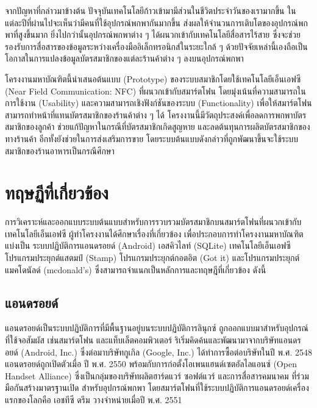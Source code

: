 \documentclass[12pt,a4paper]{article}
\begin{document}
จากปัญหาที่กล่าวมาข้างต้น ปัจจุบันเทคโนโลยีก้าวเข้ามามีส่วนในชีวิตประจำวันของเรามากขึ้น ในแต่ละปีที่ผ่านไปจะเห็นว่ามีคนที่ใช้อุปกรณ์พกพากันมากขึ้น ส่งผลให้จำนวนการเติบโตของอุปกรณ์พกพาที่สูงขึ้นมาก \cite{itm:shopping} ยิ่งไปกว่านั้นอุปกรณ์พกพาต่าง ๆ ได้ผนวกเข้ากับเทคโนโลยีสื่อสารไร้สาย ซึ่งจะช่วยรองรับการสื่อสารของข้อมูลระหว่างเครื่องมืออิเล็กทรอนิกส์ในระยะใกล้ ๆ \cite{itm:rpp-mobile} ด้วยปัจจัยเหล่านี้เองถือเป็นโอกาสในการแปลงข้อมูลบัตรสมาชิกของแต่ละร้านค้าต่าง ๆ ลงบนอุปกรณ์พกพา 

โครงงานมหาบัณฑิตนี้นำเสนอต้นแบบ (Prototype) ของระบบสมาชิกโดยใช้เทคโนโลยีเอ็นเอฟซี (Near Field Communication: NFC) ที่ผนวกเข้ากับสมาร์ตโฟน โดยมุ่งเน้นที่ความสามารถในการใช้งาน (Usability) และความสามารถเชิงฟังก์ชันของระบบ (Functionality) เพื่อให้สมาร์ตโฟนสามารถทำหน้าที่แทนบัตรสมาชิกของร้านค้าต่าง ๆ ได้ โครงงานนี้มีวัตถุประสงค์เพื่อลดการพกพาบัตรสมาชิกของลูกค้า ช่วยแก้ปัญหาในกรณีที่บัตรสมาชิกเกิดสูญหาย และลดต้นทุนการผลิตบัตรสมาชิกของทางร้านค้า อีกทั้งยังช่วยในการส่งเสริมการขาย โดยระบบต้นแบบดังกล่าวที่ถูกพัฒนาขึ้นจะใช้ระบบสมาชิกของร้านอาหารเป็นกรณีศึกษา

\section{ทฤษฏีที่เกี่ยวข้อง}
การวิเคราะห์และออกแบบระบบต้นแบบสำหรับการรวบรวมบัตรสมาชิกบนสมาร์ตโฟนที่ผนวกเข้ากับเทคโนโลยีเอ็นเอฟซี ผู้ทำโครงงานได้ศึกษาเรื่องที่เกี่ยวข้อง เพื่อประ\mbox{กอบ}การทําโครงงานมหาบัณฑิต แบ่งเป็น ระบบปฏิบัติการแอนดรอยด์ (Android) เอสคิวไลท์ (SQLite) เทคโนโลยีเอ็นเอฟซี โปรแกรมประยุกต์แสตมป์ (Stamp) โปรแกรมประยุกต์\mbox{กอต}อิต (Got it) และโปรแกรมประยุกต์แมคโดนัลด์ (mcdonald's) ซึ่ง\mbox{สามารถ}จําแนกเป็นหลักการและทฤษฎีที่เกี่ยวข้อง ดังนี้

\subsection{แอนดรอยด์}
แอนดรอยด์เป็นระบบปฏิบัติการที่มีพื้นฐานอยู่บนระบบปฏิบัติการลินุกซ์ ถูกออกแบบมาสำหรับอุปกรณ์ที่ใช้จอสัมผัส เช่นสมาร์ตโฟน และแท็บเล็ตคอมพิวเตอร์ ริเริ่มคิดค้นและพัฒนามาจากบริษัทแอนดรอยด์ (Android, Inc.) ซึ่งต่อมาบริษัทกูเกิล (Google, Inc.) ได้ทำการซื้อต่อบริษัทในปี พ.ศ. 2548 แอนดรอยด์ถูกเปิดตัวเมื่อ ปี พ.ศ. 2550 พร้อมกับการก่อตั้งโอเพนแฮนด์เซตอัลไลแอนซ์ (Open Handset Alliance) ซึ่งเป็นกลุ่มของบริษัทผลิตฮาร์ดแวร์ ซอฟต์แวร์ และการสื่อสารคมนาคม ที่ร่วมมือกันสร้างมาตรฐานเปิด สำหรับอุปกรณ์พกพา โดยสมาร์ตโฟนที่ใช้ระบบปฏิบัติการแอนดรอยด์เครื่องแรกของโลกคือ เอชทีซี ดรีม วางจำหน่ายเมื่อปี พ.ศ. 2551
\end{document}
